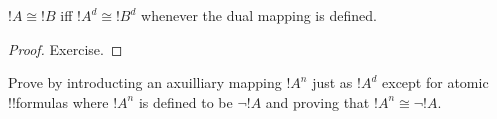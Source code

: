 \documentclass[../../../include/open-logic-section]{subfiles}
\begin{document}
\begin{prop}
$!A \cong !B$ iff $!A^d \cong !B^d$ whenever the dual mapping is defined.
\end{prop}
\begin{proof}
Exercise.
\end{proof}

\begin{prob}
Prove  by introducting an axuilliary mapping $!A^n$ just as $!A^d$ except for atomic !!{formula}s where $!A^n$ is defined to be $\lnot !A$ and proving that $!A^n \cong \lnot !A$.
\end{prob}
\end{document}
